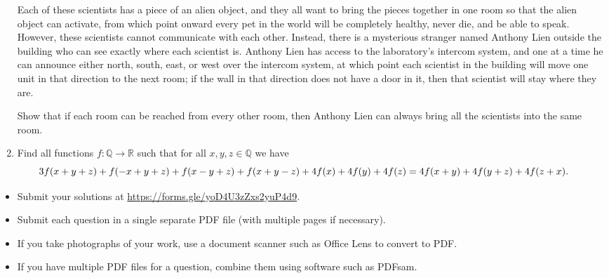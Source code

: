 \documentclass{article}
\begin{document}
\begin{enumerate}[1.]
Each of these scientists has a piece of an alien object, and they all want to bring the pieces together in one room so that the alien object can activate, from which point onward every pet in the world will be completely healthy, never die, and be able to speak.
However, these scientists cannot communicate with each other.
Instead, there is a mysterious stranger named Anthony Lien outside the building who can see exactly where each scientist is.
Anthony Lien has access to the laboratory's intercom system, and one at a time he can announce either north, south, east, or west over the intercom system, at which point each scientist in the building will move one unit in that direction to the next room; if the wall in that direction does not have a door in it, then that scientist will stay where they are.

Show that if each room can be reached from every other room, then Anthony Lien can always bring all the scientists into the same room.


\vfill
\item %
Find all functions $f : \mathbb{Q} \to \mathbb{R}$ such that for all $x, y, z \in \mathbb{Q}$ we have
\[ \mspace{-24mu} 3f(x+y+z) +f(-x+y+z) +f(x-y+z) +f(x+y-z) +4f(x) +4f(y) +4f(z) = 4f(x+y) +4f(y+z) +4f(z+x). \]


\end{enumerate}


\vfill
\vfill

\begin{itemize}
	\item Submit your solutions at \url{https://forms.gle/yoD4U3zZxs2yuP4d9}.
	\item Submit each question in a single separate PDF file (with multiple pages if necessary).
	\item If you take photographs of your work, use a document scanner such as Office Lens to convert to PDF.
	\item If you have multiple PDF files for a question, combine them using software such as PDFsam.
\end{itemize}
\end{document}
